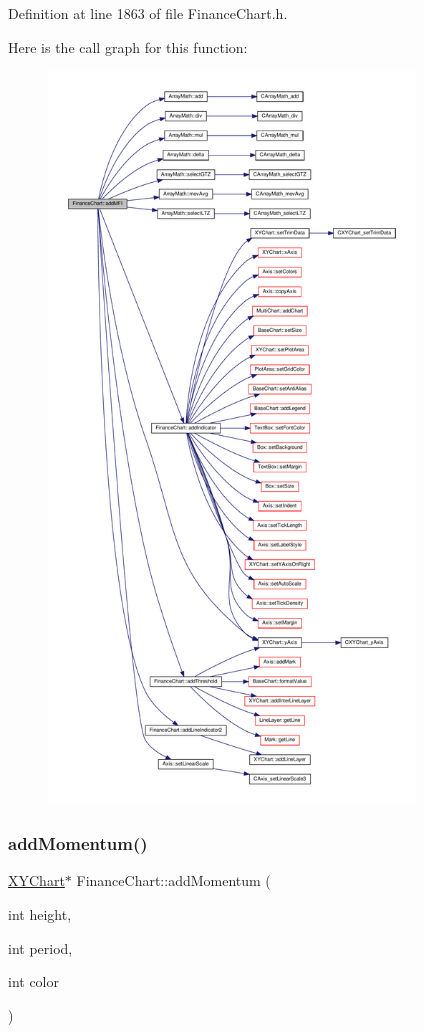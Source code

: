 Definition at line 1863 of file Finance\+Chart.\+h.

Here is the call graph for this function\+:
\nopagebreak
\begin{figure}[H]
\begin{center}
\leavevmode
\includegraphics[height=550pt]{class_finance_chart_ab6f774100ffc593f93eed25c98facf6f_cgraph}
\end{center}
\end{figure}
\mbox{\label{class_finance_chart_afbdc6d4410549928b041060bfb03b126}} 
\subsubsection{\texorpdfstring{add\+Momentum()}{addMomentum()}}
{\footnotesize\ttfamily \hyperlink{class_x_y_chart}{X\+Y\+Chart}$\ast$ Finance\+Chart\+::add\+Momentum (\begin{DoxyParamCaption}\item[{int}]{height,  }\item[{int}]{period,  }\item[{int}]{color }\end{DoxyParamCaption})\hspace{0.3cm}{\ttfamily [inline]}}




